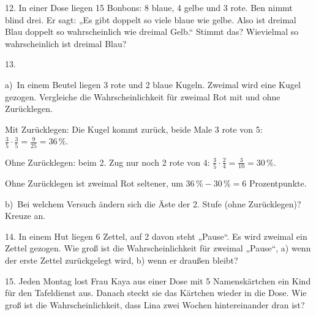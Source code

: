 \documentclass[11pt]{article}
\newcommand{\grau}[1]{{\color{mbgrau}#1}}
\begin{document}
\begin{pfaufg}{}{12.}{}
In einer Dose liegen 15 Bonbons: 8 blaue, 4 gelbe und 3 rote. Ben nimmt blind drei. Er sagt: „Es gibt doppelt so viele blaue wie gelbe. Also ist dreimal Blau doppelt so wahrscheinlich wie dreimal Gelb.“ Stimmt das? Wievielmal so wahrscheinlich ist dreimal Blau?
\end{pfaufg}

\begin{pfaufg}{}{13.}{}
\grau{a)\ In einem Beutel liegen 3 rote und 2 blaue Kugeln. Zweimal wird eine Kugel gezogen. Vergleiche die Wahrscheinlichkeit für zweimal Rot mit und ohne Zurücklegen.\par\smallskip Mit Zurücklegen: Die Kugel kommt zurück, beide Male 3 rote von 5: $\frac{3}{5} \cdot \frac{3}{5} = \frac{9}{25} = 36\,\%$.\par Ohne Zurücklegen: beim 2. Zug nur noch 2 rote von 4: $\frac{3}{5} \cdot \frac{2}{4} = \frac{3}{10} = 30\,\%$.\par Ohne Zurücklegen ist zweimal Rot seltener, um $36\,\% - 30\,\% = 6$ Prozentpunkte.}
\par\medskip
b)\ Bei welchem Versuch ändern sich die Äste der 2. Stufe (ohne Zurücklegen)? Kreuze an.
\end{pfaufg}

\begin{pfaufg}{}{14.}{}
In einem Hut liegen 6 Zettel, auf 2 davon steht „Pause“. Es wird zweimal ein Zettel gezogen. Wie groß ist die Wahrscheinlichkeit für zweimal „Pause“, a) wenn der erste Zettel zurückgelegt wird, b) wenn er draußen bleibt?
\end{pfaufg}

\begin{pfaufg}{}{15.}{}
Jeden Montag lost Frau Kaya aus einer Dose mit 5 Namenskärtchen ein Kind für den Tafeldienst aus. Danach steckt sie das Kärtchen wieder in die Dose. Wie groß ist die Wahrscheinlichkeit, dass Lina zwei Wochen hintereinander dran ist?
\end{pfaufg}
\end{document}
